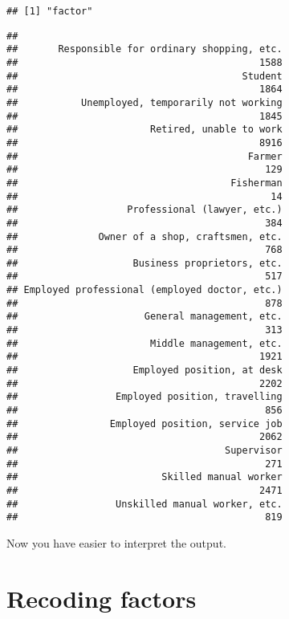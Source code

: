 \documentclass[
]{book}
\newenvironment{Shaded}{\begin{snugshade}}{\end{snugshade}}
\newcommand{\FunctionTok}[1]{\textcolor[rgb]{0.13,0.29,0.53}{\textbf{#1}}}
\newcommand{\NormalTok}[1]{#1}
\newcommand{\SpecialCharTok}[1]{\textcolor[rgb]{0.81,0.36,0.00}{\textbf{#1}}}
\begin{document}
\begin{verbatim}
## [1] "factor"
\end{verbatim}

\begin{Shaded}
\end{Shaded}

\begin{verbatim}
## 
##       Responsible for ordinary shopping, etc. 
##                                          1588 
##                                       Student 
##                                          1864 
##           Unemployed, temporarily not working 
##                                          1845 
##                       Retired, unable to work 
##                                          8916 
##                                        Farmer 
##                                           129 
##                                     Fisherman 
##                                            14 
##                   Professional (lawyer, etc.) 
##                                           384 
##              Owner of a shop, craftsmen, etc. 
##                                           768 
##                    Business proprietors, etc. 
##                                           517 
## Employed professional (employed doctor, etc.) 
##                                           878 
##                      General management, etc. 
##                                           313 
##                       Middle management, etc. 
##                                          1921 
##                    Employed position, at desk 
##                                          2202 
##                 Employed position, travelling 
##                                           856 
##                Employed position, service job 
##                                          2062 
##                                    Supervisor 
##                                           271 
##                         Skilled manual worker 
##                                          2471 
##                 Unskilled manual worker, etc. 
##                                           819
\end{verbatim}

Now you have easier to interpret the output.

\section{Recoding factors}\label{recoding-factors}
\end{document}
